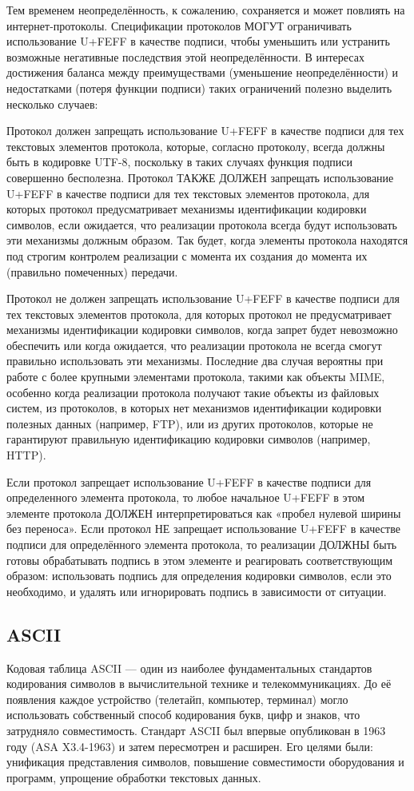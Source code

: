 \documentclass{ou}
\begin{document}
 Тем временем неопределённость, к сожалению, сохраняется и может повлиять на интернет-протоколы. Спецификации протоколов МОГУТ ограничивать использование U+FEFF в качестве подписи, чтобы уменьшить или устранить возможные негативные последствия этой неопределённости. В интересах достижения баланса между преимуществами (уменьшение неопределённости) и недостатками (потеря функции подписи) таких ограничений полезно выделить несколько случаев: 
 
Протокол должен запрещать использование U+FEFF в качестве подписи для тех текстовых элементов протокола, которые, согласно протоколу, всегда должны быть  в кодировке UTF-8, поскольку в таких случаях функция подписи совершенно бесполезна. Протокол ТАКЖЕ ДОЛЖЕН запрещать использование U+FEFF в качестве подписи для тех текстовых элементов протокола, для которых протокол предусматривает механизмы идентификации кодировки символов, если ожидается, что реализации протокола всегда будут использовать эти механизмы должным образом. Так будет, когда элементы протокола находятся под строгим контролем реализации с момента их создания до момента их (правильно помеченных) передачи.

Протокол не должен запрещать использование U+FEFF в качестве подписи для тех текстовых элементов протокола, для которых протокол не предусматривает механизмы идентификации кодировки символов, когда запрет будет невозможно обеспечить или когда ожидается, что реализации протокола не всегда смогут правильно использовать эти механизмы. Последние два случая вероятны при работе с более крупными элементами протокола, такими как объекты MIME, особенно когда реализации протокола получают такие объекты из файловых систем, из протоколов, в которых нет механизмов идентификации кодировки полезных данных (например, FTP), или из других протоколов, которые не гарантируют правильную идентификацию кодировки символов (например, HTTP). 

Если протокол запрещает использование U+FEFF в качестве подписи для определенного элемента протокола, то любое начальное U+FEFF в этом элементе протокола ДОЛЖЕН интерпретироваться как «пробел нулевой ширины без переноса». Если протокол НЕ запрещает использование U+FEFF в качестве подписи для определённого элемента протокола, то реализации ДОЛЖНЫ быть готовы обрабатывать подпись в этом элементе и реагировать соответствующим образом: использовать подпись для определения кодировки символов, если это необходимо, и удалять или игнорировать подпись в зависимости от ситуации.
\newpage
\subsection{ASCII}
Кодовая таблица ASCII — один из наиболее фундаментальных стандартов кодирования символов в вычислительной технике и телекоммуникациях. До её появления каждое устройство (телетайп, компьютер, терминал) могло использовать собственный способ кодирования букв, цифр и знаков, что затрудняло совместимость. Стандарт ASCII был впервые опубликован в 1963 году (ASA X3.4-1963) и затем пересмотрен и расширен. Его целями были: унификация представления символов, повышение совместимости оборудования и программ, упрощение обработки текстовых данных. 
\end{document}
